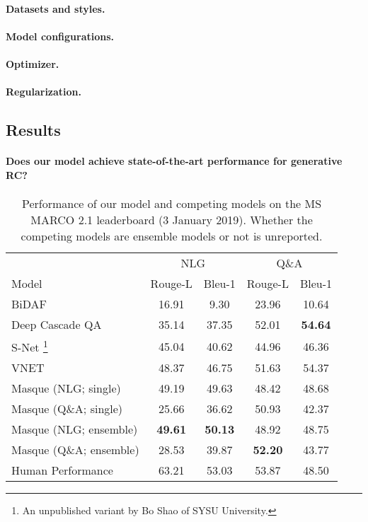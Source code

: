 \documentclass[11pt,a4paper]{article}
\theoremstyle{mydef}
\theoremstyle{myprob}
\begin{document}
\paragraph{Datasets and styles.}

\paragraph{Model configurations.}

\paragraph{Optimizer.}

\paragraph{Regularization.}

\subsection{Results}

\paragraph{Does our model achieve state-of-the-art performance for generative RC?}

\begin{table}
\centering
{\small \tabcolsep=1.4pt
\begin{tabular}{l|cc|cc}
\hline
 & \multicolumn{2}{c|}{NLG} & \multicolumn{2}{c}{Q\&A}\\ %
Model & Rouge-L & Bleu-1 & Rouge-L & Bleu-1\\ \hline
BiDAF \citeyearpar{SeoKFH17} & 16.91 & 9.30 & 23.96 & 10.64 \\
Deep Cascade QA \citeyearpar{YanAAAI19} & 35.14 & 37.35 &  52.01 & {\bf 54.64}\\ 
S-Net \citeyearpar{TanWYDLZ18}\footnote{An unpublished variant by Bo Shao of SYSU University.}   & 45.04 & 40.62 & 44.96 & 46.36\\
VNET \citeyearpar{WuWLHWLLL18}  & 48.37 & 46.75 & 51.63 & 54.37\\ \hline
Masque (NLG; single) & 49.19 &  49.63 & 48.42 & 48.68\\
Masque (Q\&A; single) & 25.66 & 36.62 & 50.93 & 42.37\\ 
\hline
Masque (NLG; ensemble) & {\bf 49.61} & {\bf 50.13} & 48.92& 48.75 \\
Masque (Q\&A; ensemble) & 28.53 & 39.87 & {\bf 52.20} & 43.77 \\ 
\hline
Human Performance & 63.21 & 53.03  & 53.87 & 48.50\\
\hline
\end{tabular}
}
\caption{Performance of our model and competing models on the MS MARCO 2.1 leaderboard (3 January 2019). 
Whether the competing models are ensemble models or not is unreported. }
\label{tb:nlg-leaderboard}
\end{table}
\end{document}
